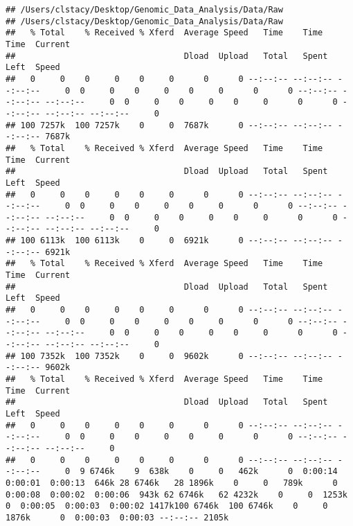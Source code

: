 \documentclass[
]{book}
\newenvironment{Shaded}{\begin{snugshade}}{\end{snugshade}}
\newcommand{\AttributeTok}[1]{\textcolor[rgb]{0.13,0.29,0.53}{#1}}
\newcommand{\CommentTok}[1]{\textcolor[rgb]{0.56,0.35,0.01}{\textit{#1}}}
\newcommand{\ExtensionTok}[1]{#1}
\newcommand{\FunctionTok}[1]{\textcolor[rgb]{0.13,0.29,0.53}{\textbf{#1}}}
\newcommand{\KeywordTok}[1]{\textcolor[rgb]{0.13,0.29,0.53}{\textbf{#1}}}
\newcommand{\NormalTok}[1]{#1}
\newcommand{\VariableTok}[1]{\textcolor[rgb]{0.00,0.00,0.00}{#1}}
\begin{document}
\begin{Shaded}
\end{Shaded}

\begin{verbatim}
## /Users/clstacy/Desktop/Genomic_Data_Analysis/Data/Raw
## /Users/clstacy/Desktop/Genomic_Data_Analysis/Data/Raw
##   % Total    % Received % Xferd  Average Speed   Time    Time     Time  Current
##                                  Dload  Upload   Total   Spent    Left  Speed
##   0     0    0     0    0     0      0      0 --:--:-- --:--:-- --:--:--     0  0     0    0     0    0     0      0      0 --:--:-- --:--:-- --:--:--     0  0     0    0     0    0     0      0      0 --:--:-- --:--:-- --:--:--     0
## 100 7257k  100 7257k    0     0  7687k      0 --:--:-- --:--:-- --:--:-- 7687k
##   % Total    % Received % Xferd  Average Speed   Time    Time     Time  Current
##                                  Dload  Upload   Total   Spent    Left  Speed
##   0     0    0     0    0     0      0      0 --:--:-- --:--:-- --:--:--     0  0     0    0     0    0     0      0      0 --:--:-- --:--:-- --:--:--     0  0     0    0     0    0     0      0      0 --:--:-- --:--:-- --:--:--     0
## 100 6113k  100 6113k    0     0  6921k      0 --:--:-- --:--:-- --:--:-- 6921k
##   % Total    % Received % Xferd  Average Speed   Time    Time     Time  Current
##                                  Dload  Upload   Total   Spent    Left  Speed
##   0     0    0     0    0     0      0      0 --:--:-- --:--:-- --:--:--     0  0     0    0     0    0     0      0      0 --:--:-- --:--:-- --:--:--     0  0     0    0     0    0     0      0      0 --:--:-- --:--:-- --:--:--     0
## 100 7352k  100 7352k    0     0  9602k      0 --:--:-- --:--:-- --:--:-- 9602k
##   % Total    % Received % Xferd  Average Speed   Time    Time     Time  Current
##                                  Dload  Upload   Total   Spent    Left  Speed
##   0     0    0     0    0     0      0      0 --:--:-- --:--:-- --:--:--     0  0     0    0     0    0     0      0      0 --:--:-- --:--:-- --:--:--     0
##   0     0    0     0    0     0      0      0 --:--:-- --:--:-- --:--:--     0  9 6746k    9  638k    0     0   462k      0  0:00:14  0:00:01  0:00:13  646k 28 6746k   28 1896k    0     0   789k      0  0:00:08  0:00:02  0:00:06  943k 62 6746k   62 4232k    0     0  1253k      0  0:00:05  0:00:03  0:00:02 1417k100 6746k  100 6746k    0     0  1876k      0  0:00:03  0:00:03 --:--:-- 2105k

\end{verbatim}
\end{document}
